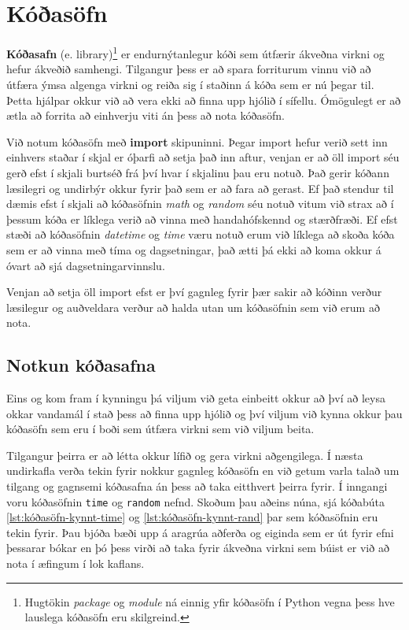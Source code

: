 
\chapter{Kóðasöfn}\label{k:import}
\textbf{Kóðasafn} (e. library)\footnote{Hugtökin \textit{package} og \textit{module} ná einnig yfir kóðasöfn í Python vegna þess hve lauslega kóðasöfn eru skilgreind.} er endurnýtanlegur kóði sem útfærir ákveðna virkni og hefur ákveðið samhengi.
Tilgangur þess er að spara forriturum vinnu við að útfæra ýmsa algenga virkni og reiða sig í staðinn á kóða sem er nú þegar til.
Þetta hjálpar okkur við að vera ekki að finna upp hjólið í sífellu.
Ómögulegt er að ætla að forrita að einhverju viti án þess að nota kóðasöfn.

Við notum kóðasöfn með \textbf{import} skipuninni. 
Þegar import hefur verið sett inn einhvers staðar í skjal er óþarfi að setja það inn aftur, venjan er að öll import séu gerð efst í skjali burtséð frá því hvar í skjalinu þau eru notuð.
Það gerir kóðann læsilegri og undirbýr okkur fyrir það sem er að fara að gerast.
Ef það stendur til dæmis efst í skjali að kóðasöfnin \textit{math} og \textit{random} séu notuð vitum við strax að í þessum kóða er líklega verið að vinna með handahófskennd og stærðfræði.
Ef efst stæði að kóðasöfnin \textit{datetime} og \textit{time} væru notuð erum við líklega að skoða kóða sem er að vinna með tíma og dagsetningar, það ætti þá ekki að koma okkur á óvart að sjá dagsetningarvinnslu.

Venjan að setja öll import efst er því gagnleg fyrir þær sakir að kóðinn verður læsilegur og auðveldara verður að halda utan um kóðasöfnin sem við erum að nota.

\section{Notkun kóðasafna}\label{uk:kóðasöfn-kynnt}
Eins og kom fram í kynningu þá viljum við geta einbeitt okkur að því að leysa okkar vandamál í stað þess að finna upp hjólið og því viljum við kynna okkur þau kóðasöfn sem eru í boði sem útfæra virkni sem við viljum beita.

Tilgangur þeirra er að létta okkur lífið og gera virkni aðgengilega.
Í næsta undirkafla verða tekin fyrir nokkur gagnleg kóðasöfn en við getum varla talað um tilgang og gagnsemi kóðasafna án þess að taka eitthvert þeirra fyrir.
Í inngangi voru kóðasöfnin \texttt{time} og \texttt{random} nefnd.
Skoðum þau aðeins núna, sjá kóðabúta \ref{lst:kóðasöfn-kynnt-time} og \ref{lst:kóðasöfn-kynnt-rand} þar sem kóðasöfnin eru tekin fyrir.
Þau bjóða bæði upp á aragrúa aðferða og eiginda sem er út fyrir efni þessarar bókar en þó þess virði að taka fyrir ákveðna virkni sem búist er við að nota í æfingum í lok kaflans.
